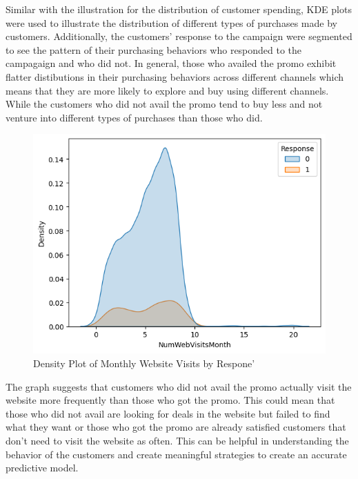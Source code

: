 Similar with the illustration for the distribution of customer spending, KDE plots were used to illustrate the distribution of different types of purchases made by customers. Additionally, the customers' response to the campaign were segmented to see the pattern of their purchasing behaviors who responded to the campagaign and who did not. In general, those who availed the promo exhibit flatter distibutions in their purchasing behaviors across different channels which means that they are more likely to explore and buy using different channels. While the customers who did not avail the promo tend to buy less and not venture into different types of purchases than those who did.

\begin{figure}[H]
    \centering
    \includegraphics[width=\linewidth]{figures/numwebvisits.png}
    \caption{Density Plot of Monthly Website Visits by Respone'}
\end{figure}

The graph suggests that customers who did not avail the promo actually visit the website more frequently than those who got the promo. This could mean that those who did not avail are looking for deals in the website but failed to find what they want or those who got the promo are already satisfied customers that don't need to visit the website as often. This can be helpful in understanding the behavior of the customers and create meaningful strategies to create an accurate predictive model.
